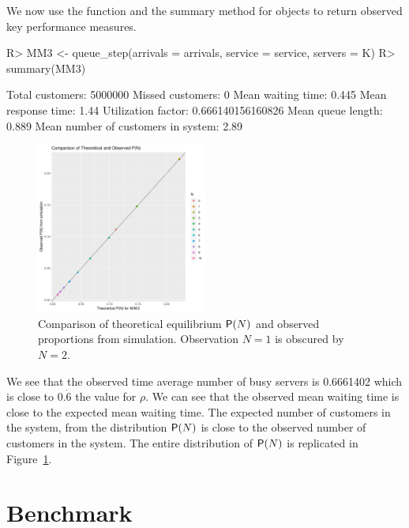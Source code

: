 \documentclass[article]{jss}
\begin{document}
We now use the  function and the summary method for  objects  to return observed key performance measures. 

\begin{CodeChunk}
\begin{Sinput}
R> MM3 <- queue_step(arrivals = arrivals, service = service, servers = K)
R> summary(MM3)
\end{Sinput}
\begin{Soutput}
Total customers:
 5000000
Missed customers:
 0
Mean waiting time:
 0.445
Mean response time:
 1.44
Utilization factor:
 0.666140156160826
Mean queue length:
 0.889
Mean number of customers in system:
 2.89
\end{Soutput}
\end{CodeChunk}

\begin{figure}[!htb]
  \centering
  \includegraphics[width = 0.5\textwidth]{figures/theoretical.pdf}
  \caption{Comparison of theoretical equilibrium $\mathsf{P}(N)$ and observed proportions from simulation. Observation $N = 1$ is obscured by $N = 2$.}
  \label{fig:theoretical}
\end{figure}

We see that the observed time average number of busy servers is 0.6661402 which is close to $0.\dot{6}$ the value for $\rho$. We can see that the observed mean waiting time is close to the expected mean waiting time. The expected number of customers in the system, from the distribution $\mathsf{P}(N)$ is close to the observed number of customers in the system. The entire distribution of $\mathsf{P}(N)$ is replicated in Figure~\ref{fig:theoretical}. 

\section{Benchmark} \label{sec:Benchmark}
\end{document}
